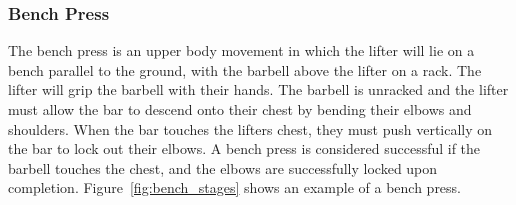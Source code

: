 \subsubsection{Bench Press}

The bench press is an upper body movement in which the lifter will lie on a bench parallel to the ground, with the barbell above the lifter on a rack. The lifter will grip the barbell with their hands. The barbell is unracked and the lifter must allow the bar to descend onto their chest by bending their elbows and shoulders. When the bar touches the lifters chest, they must push vertically on the bar to lock out their elbows. A bench press is considered successful if the barbell touches the chest, and the elbows are successfully locked upon completion. Figure~\ref{fig:bench_stages} shows an example of a bench press.

